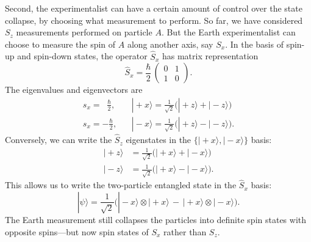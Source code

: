 \documentclass[pra,11pt]{revtex4}
\begin{document}
Second, the experimentalist can have a certain amount of control over
the state collapse, by choosing what measurement to perform.  So far,
we have considered $S_z$ measurements performed on particle $A$.  But
the Earth experimentalist can choose to measure the spin of $A$ along
another axis, say $S_x$.  In the basis of spin-up and spin-down states,
the operator $\hat{S}_x$ has matrix representation
$$\hat{S}_x = \frac{\hbar}{2}\, \begin{pmatrix}0&1\\1&0\end{pmatrix}.$$
The eigenvalues and eigenvectors are
$$\begin{aligned}s_x = \;\;\frac{\hbar}{2},\; &\;\;\; |\!+\!x\rangle = \frac{1}{\sqrt{2}}\Big(|\!+\!z\rangle + |\!-\!z\rangle\Big) \\ s_x = -\frac{\hbar}{2}, &\;\;\; |\!-\!x\rangle = \frac{1}{\sqrt{2}}\Big(|\!+\!z\rangle - |\!-\!z\rangle\Big).\end{aligned}$$
Conversely, we can write the $\hat{S}_z$ eigenstates in the $\{|\!+\!x\rangle,|\!-\!x\rangle\}$ basis:
$$\begin{aligned}|\!+\!z\rangle &= \frac{1}{\sqrt{2}}\Big(|\!+\!x\rangle + |\!-\!x\rangle\Big) \\ |\!-\!z\rangle &= \frac{1}{\sqrt{2}}\Big(|\!+\!x\rangle - |\!-\!x\rangle\Big).\end{aligned}$$
This allows us to write the two-particle entangled state in the
$\hat{S}_x$ basis:
$$|\psi\rangle = \frac{1}{\sqrt{2}} \Big(|\!-\!x\rangle\otimes|\!+\!x\rangle \,-\, |\!+\!x\rangle\otimes|\!-\!x\rangle\Big).$$
The Earth measurement still collapses the particles into definite spin
states with opposite spins---but now spin states of ${S}_x$ rather
than ${S}_z$.
\end{document}
